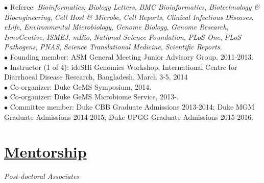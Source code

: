 \documentclass[overlapped,line,11pt]{res}
\begin{document}
\begin{resume}
\hangindent=0.5in $\bullet$\hspace{.1in} Referee:
\emph{Bioinformatics}, \emph{Biology Letters}, \emph{BMC Bioinformatics}, \emph{Biotechnology \& Bioengineering}, \emph{Cell Host \& Microbe}, \emph{Cell Reports}, \emph{Clinical
  Infectious Diseases}, \emph{eLife}, \emph{Environmental Microbiology}, \emph{Genome Biology}, \emph{Genome
  Research}, \emph{InnoCentive}, \emph{ISMEJ}, \emph{mBio}, \emph{National Science Foundation}, \emph{PLoS One},
\emph{PLoS Pathogens}, \emph{PNAS}, \emph{Science Translational Medicine}, \emph{Scientific Reports}. \\

\vspace{-10mm}
\hangindent=0.5in $\bullet$\hspace{.1in} Founding member: ASM General Meeting
Junior Advisory Group, 2011-2013. \\

\vspace{-10mm}
\hangindent=0.5in $\bullet$\hspace{.1in} Instructor (1 of 4): ideSHi
Genomics Workshop, International Centre for Diarrhoeal
Disease Research, Bangladesh, March 3-5, 2014 \\

\vspace{-10mm}
\hangindent=0.5in $\bullet$\hspace{.1in} Co-organizer: Duke GeMS
Symposium, 2014. \\

\vspace{-10mm}
\hangindent=0.5in $\bullet$\hspace{.1in} Co-organizer: Duke GeMS
Microbiome Service, 2013-. \\

\vspace{-10mm} \hangindent=0.5in $\bullet$\hspace{.1in} Committee
member: Duke CBB Graduate Admissions 2013-2014; Duke MGM Graduate
Admissions 2014-2015; Duke UPGG Graduate Admissions 2015-2016.


\section{\underline{\sc Mentorship}}
\vspace{.1in}

\emph{Post-doctoral Associates}
\vspace{.1in}

\begin{itemize}[leftmargin=2cm, style=sameline, itemsep=0mm]


\end{itemize}
\end{resume}
\end{document}
